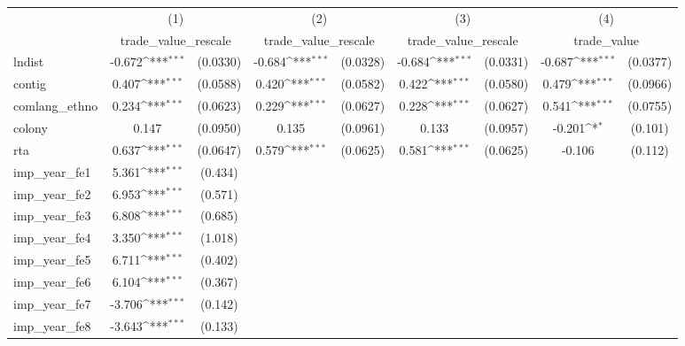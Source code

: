 {
\def\sym#1{\ifmmode^{#1}\else\(^{#1}\)\fi}
\begin{tabular}{l*{4}{cc}}
\hline\hline
          &\multicolumn{2}{c}{(1)}     &\multicolumn{2}{c}{(2)}     &\multicolumn{2}{c}{(3)}     &\multicolumn{2}{c}{(4)}     \\
          &\multicolumn{2}{c}{trade\_value\_rescale}&\multicolumn{2}{c}{trade\_value\_rescale}&\multicolumn{2}{c}{trade\_value\_rescale}&\multicolumn{2}{c}{trade\_value}\\
\hline
lndist    &   -0.672\sym{***}& (0.0330)&   -0.684\sym{***}& (0.0328)&   -0.684\sym{***}& (0.0331)&   -0.687\sym{***}& (0.0377)\\
contig    &    0.407\sym{***}& (0.0588)&    0.420\sym{***}& (0.0582)&    0.422\sym{***}& (0.0580)&    0.479\sym{***}& (0.0966)\\
comlang\_ethno&    0.234\sym{***}& (0.0623)&    0.229\sym{***}& (0.0627)&    0.228\sym{***}& (0.0627)&    0.541\sym{***}& (0.0755)\\
colony    &    0.147         & (0.0950)&    0.135         & (0.0961)&    0.133         & (0.0957)&   -0.201\sym{*}  &  (0.101)\\
rta       &    0.637\sym{***}& (0.0647)&    0.579\sym{***}& (0.0625)&    0.581\sym{***}& (0.0625)&   -0.106         &  (0.112)\\
imp\_year\_fe1&    5.361\sym{***}&  (0.434)&                  &         &                  &         &                  &         \\
imp\_year\_fe2&    6.953\sym{***}&  (0.571)&                  &         &                  &         &                  &         \\
imp\_year\_fe3&    6.808\sym{***}&  (0.685)&                  &         &                  &         &                  &         \\
imp\_year\_fe4&    3.350\sym{***}&  (1.018)&                  &         &                  &         &                  &         \\
imp\_year\_fe5&    6.711\sym{***}&  (0.402)&                  &         &                  &         &                  &         \\
imp\_year\_fe6&    6.104\sym{***}&  (0.367)&                  &         &                  &         &                  &         \\
imp\_year\_fe7&   -3.706\sym{***}&  (0.142)&                  &         &                  &         &                  &         \\
imp\_year\_fe8&   -3.643\sym{***}&  (0.133)&                  &         &                  &         &                  &         \\

\end{tabular}}
